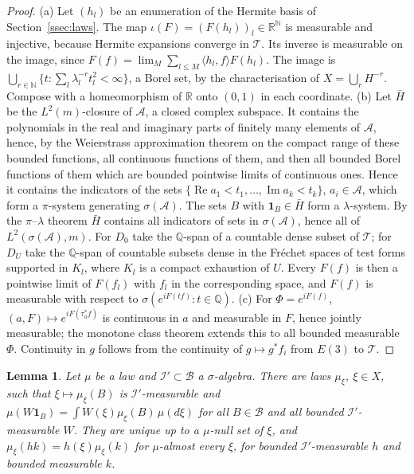\documentclass[11pt]{amsart}
\theoremstyle{plain}
\newtheorem{lemma}[theorem]{Lemma}
\theoremstyle{definition}
\theoremstyle{remark}
\numberwithin{equation}{section}
\newcommand{\R}{\mathbb{R}}
\newcommand{\N}{\mathbb{N}}
\newcommand{\Q}{\mathbb{Q}}
\newcommand{\cA}{\mathcal{A}}
\newcommand{\cB}{\mathcal{B}}
\newcommand{\cI}{\mathcal{I}}
\newcommand{\cT}{\mathcal{T}}
\newcommand{\Eu}{E(3)}
\newcommand{\ip}[2]{\langle #1,#2\rangle}
\DeclareMathOperator{\re}{Re}
\DeclareMathOperator{\im}{Im}
\begin{document}
\begin{proof}
(a) Let $(h_l)$ be an enumeration of the Hermite basis of Section~\ref{ssec:laws}. The map $\iota(F)=(F(h_l))_l\in\R^\N$ is measurable and injective, because Hermite expansions converge in $\cT$. Its inverse is measurable on the image, since $F(f)=\lim_M\sum_{l\le M}\ip{h_l}fF(h_l)$. The image is $\bigcup_{r\in\N}\{t:\sum_l\lambda_l^{-r}t_l^2<\infty\}$, a Borel set, by the characterisation of $X=\bigcup_rH^{-r}$. Compose with a homeomorphism of $\R$ onto $(0,1)$ in each coordinate.
(b) Let $\bar H$ be the $L^2(m)$-closure of $\cA$, a closed complex subspace. It contains the polynomials in the real and imaginary parts of finitely many elements of $\cA$, hence, by the Weierstrass approximation theorem on the compact range of these bounded functions, all continuous functions of them, and then all bounded Borel functions of them which are bounded pointwise limits of continuous ones. Hence it contains the indicators of the sets $\{\re a_1<t_1,\dots,\im a_k<t_k\}$, $a_i\in\cA$, which form a $\pi$-system generating $\sigma(\cA)$. The sets $B$ with $\mathbf 1_B\in\bar H$ form a $\lambda$-system. By the $\pi$--$\lambda$ theorem $\bar H$ contains all indicators of sets in $\sigma(\cA)$, hence all of $L^2(\sigma(\cA),m)$. For $D_0$ take the $\Q$-span of a countable dense subset of $\cT$; for $D_U$ take the $\Q$-span of countable subsets dense in the Fr\'echet spaces of test forms supported in $K_l$, where $K_l$ is a compact exhaustion of $U$. Every $F(f)$ is then a pointwise limit of $F(f_l)$ with $f_l$ in the corresponding space, and $F(f)$ is measurable with respect to $\sigma(e^{iF(tf)}:t\in\Q)$.
(c) For $\Phi=e^{iF(f)}$, $(a,F)\mapsto e^{iF(\tau_a^*f)}$ is continuous in $a$ and measurable in $F$, hence jointly measurable; the monotone class theorem extends this to all bounded measurable $\Phi$. Continuity in $g$ follows from the continuity of $g\mapsto g^*f_i$ from $\Eu$ to $\cT$.
\end{proof}

\begin{lemma}\label{lem:A-kernel}
Let $\mu$ be a law and $\cI'\subset\cB$ a $\sigma$-algebra. There are laws $\mu_\xi$, $\xi\in X$, such that $\xi\mapsto\mu_\xi(B)$ is $\cI'$-measurable and $\mu(W\mathbf 1_B)=\int W(\xi)\mu_\xi(B)\,\mu(d\xi)$ for all $B\in\cB$ and all bounded $\cI'$-measurable $W$. They are unique up to a $\mu$-null set of $\xi$, and $\mu_\xi(hk)=h(\xi)\mu_\xi(k)$ for $\mu$-almost every $\xi$, for bounded $\cI'$-measurable $h$ and bounded measurable $k$.
\end{lemma}
\end{document}

